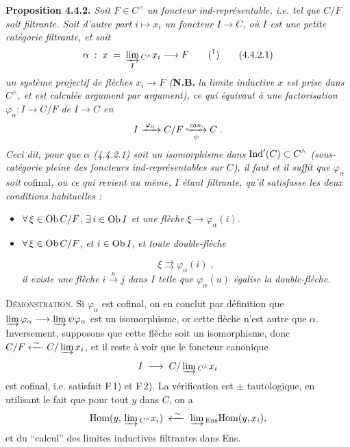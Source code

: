 \textbf{Proposition 4.4.2.} \textit{Soit $F \in C^{\wedge}$ un foncteur ind-représentable, i.e. tel que $C/F$ soit filtrante. Soit d'autre part $i \longmapsto x_i$ un foncteur $I \longrightarrow C$, où $I$ est une petite catégorie filtrante, et soit}
\[
\alpha \;:\; x \;=\; \varinjlim_{I}{}_{C^{\wedge}} x_i \longrightarrow F \qquad \text{(\footnotemark)} \tag*{(4.4.2.1)}
\]
\textit{un système projectif de flèches $x_i \longrightarrow F$ (}\textbf{N.B.} \textit{la limite inductive $x$ est prise dans $C^{\wedge}$, et est calculée argument par argument), ce qui équivaut à une factorisation $\varphi_\alpha : I \longrightarrow C/F$ de $I \longrightarrow C$ en}
\[
I \xrightarrow{\;\varphi_\alpha\;} C/F \hookxrightarrow[\psi]{\textit{can.}} C \;.
\]
\textit{Ceci dit, pour que $\alpha$ (4.4.2.1) soit un isomorphisme dans} $\operatorname{Ind}'(C) \subset C^{\wedge}$ \textit{(sous-catégorie pleine des foncteurs ind-représentables sur $C$), il faut et il suffit que $\varphi_\alpha$ soit} cofinal\textit{, ou ce qui revient au même, $I$ étant filtrante, qu'il satisfasse les deux conditions habituelles :}
\begin{itemize}[leftmargin=2.5em]
\item[F\,1)] $\forall\, \xi \in \mathrm{Ob}\, C/F$, $\exists\, i \in \mathrm{Ob}\, I$ \textit{et une flèche} $\xi \longrightarrow \varphi_\alpha(i)$.
\item[F\,2)] $\forall\, \xi \in \mathrm{Ob}\, C/F$, \textit{et} $i \in \mathrm{Ob}\, I$, \textit{et toute double-flèche}

\[
\xi \rightrightarrows \varphi_\alpha(i) \;,
\]
\textit{il existe une flèche $i \xrightarrow{\;u\;} j$ dans $I$ telle que $\varphi_\alpha(u)$ égalise la double-flèche.}
\end{itemize}
\textsc{Démonstration}. Si $\varphi_\alpha$ est cofinal, on en conclut par définition que $\varinjlim \varphi_\alpha \longrightarrow \varinjlim \psi\varphi_\alpha$ est un isomorphisme, or cette flèche n'est autre que $\alpha$. Inversement, supposons que cette flèche soit un isomorphisme, donc $C/F \xleftarrow{\;\sim\;} C/\varinjlim x_i$, et il reste à voir que le foncteur canonique
\[
I \;\longrightarrow\; C/\varinjlim{}_{C^{\wedge}} x_i
\]
est cofinal, i.e. satisfait F\,1) et F\,2). La vérification est $\pm$ tautologique, en utilisant le fait que pour tout $y$ dans $C$, on a
\[
\mathrm{Hom}(y,\, \varinjlim{}_{C^{\wedge}} x_i) \;\xleftarrow{\;\sim\;}\; \varinjlim{}_{\mathrm{Ens}}\mathrm{Hom}(y,x_i),
\]
et du “calcul” des limites inductives filtrantes dans Ens.

